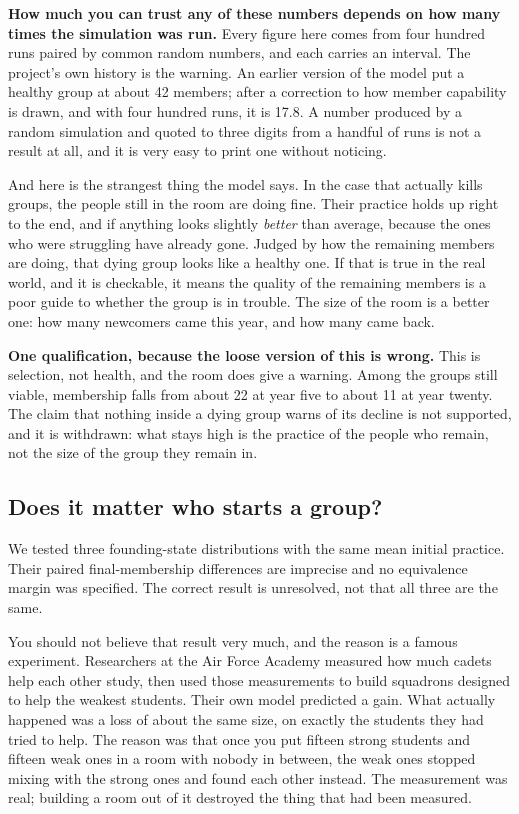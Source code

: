 \documentclass[11pt,a4paper]{article}
\begin{document}
\textbf{How much you can trust any of these numbers depends on how many times the
simulation was run.} Every figure here comes from four hundred runs paired by common
random numbers, and each carries an interval. The project's own history is the
warning. An earlier version of the model put a healthy group at about 42 members;
after a correction to how member capability is drawn, and with four hundred runs, it
is 17.8. A number produced by a random simulation and quoted to three digits from a
handful of runs is not a result at all, and it is very easy to print one without
noticing.

And here is the strangest thing the model says. In the case that actually kills
groups, the people still in the room are doing fine. Their practice holds up right to
the end, and if anything looks slightly \emph{better} than average, because the ones
who were struggling have already gone. Judged by how the remaining members are doing,
that dying group looks like a healthy one. If that is true in the real world, and it
is checkable, it means the quality of the remaining members is a poor guide to
whether the group is in trouble. The size of the room is a better one: how many
newcomers came this year, and how many came back.

\textbf{One qualification, because the loose version of this is wrong.} This is
selection, not health, and the room does give a warning. Among the groups still
viable, membership falls from about 22 at year five to about 11 at year twenty. The
claim that nothing inside a dying group warns of its decline is not supported, and
it is withdrawn: what stays high is the practice of the people who remain, not the
size of the group they remain in.

\subsection{Does it matter who starts a group?}

We tested three founding-state distributions with the same mean initial practice.
Their paired final-membership differences are imprecise and no equivalence margin
was specified. The correct result is unresolved, not that all three are the same.

You should not believe that result very much, and the reason is a famous
experiment. Researchers at the Air Force Academy measured how much cadets help
each other study, then used those measurements to build squadrons designed to help
the weakest students. Their own model predicted a gain. What actually happened was
a loss of about the same size, on exactly the students they had tried to help. The
reason was that once you put fifteen strong students and fifteen weak ones in a
room with nobody in between, the weak ones stopped mixing with the strong ones and
found each other instead. The measurement was real; building a room out of it
destroyed the thing that had been measured.
\end{document}
